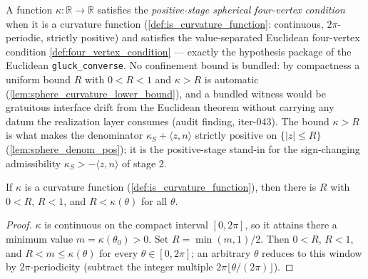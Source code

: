 \begin{definition}
  \label{def:sphere_four_vertex}
  A function $\kappa:\mathbb R\to\mathbb R$ satisfies the \emph{positive-stage spherical
  four-vertex condition} when it is a curvature function (\cref{def:is_curvature_function}:
  continuous, $2\pi$-periodic, strictly positive) and satisfies the value-separated Euclidean
  four-vertex condition \cref{def:four_vertex_condition} — exactly the hypothesis package of
  the Euclidean \texttt{gluck\_converse}. No confinement bound is bundled: by compactness a
  uniform bound $R$ with $0<R<1$ and $\kappa>R$ is automatic
  (\cref{lem:sphere_curvature_lower_bound}), and a bundled witness would be gratuitous
  interface drift from the Euclidean theorem without carrying any datum the realization
  layer consumes (audit finding, iter-043). The bound $\kappa>R$ is what makes the
  denominator $\kappa_S+\langle z,n\rangle$ strictly positive on $\{|z|\le R\}$
  (\cref{lem:sphere_denom_pos}); it is the positive-stage stand-in for the sign-changing
  admissibility $\kappa_S>-\langle z,n\rangle$ of stage 2.
\end{definition}

\begin{lemma}
  \label{lem:sphere_curvature_lower_bound}
  If $\kappa$ is a curvature function (\cref{def:is_curvature_function}), then there is $R$
  with $0<R$, $R<1$, and $R<\kappa(\theta)$ for all $\theta$.
\end{lemma}

\begin{proof}

\leanok
  $\kappa$ is continuous on the compact interval $[0,2\pi]$, so it attains there a minimum
  value $m=\kappa(\theta_0)>0$. Set $R=\min(m,1)/2$. Then $0<R$, $R<1$, and
  $R<m\le\kappa(\theta)$ for every $\theta\in[0,2\pi]$; an arbitrary $\theta$ reduces to
  this window by $2\pi$-periodicity (subtract the integer multiple
  $2\pi\lfloor\theta/(2\pi)\rfloor$).
\end{proof}

